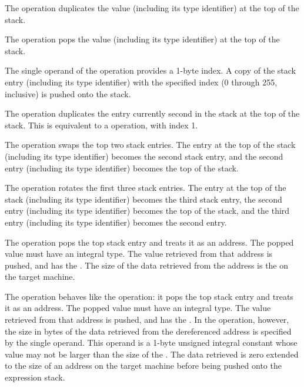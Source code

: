 \begin{enumerate}[1. ]
\itembfnl{\DWOPdupTARG}
The \DWOPdupNAME{} operation duplicates the value (including its 
type identifier) at the top of the stack.

\itembfnl{\DWOPdropTARG}
The \DWOPdropNAME{} operation pops the value (including its type 
identifier) at the top of the stack.

\itembfnl{\DWOPpickTARG}
The single operand of the \DWOPpickNAME{} operation provides a
1-byte index. A copy of the stack entry (including its 
type identifier) with the specified
index (0 through 255, inclusive) is pushed onto the stack.

\itembfnl{\DWOPoverTARG}
The \DWOPoverNAME{} operation duplicates the entry currently second
in the stack at the top of the stack. 
This is equivalent to a
\DWOPpick{} operation, with index 1.  

\itembfnl{\DWOPswapTARG}
The \DWOPswapNAME{} operation swaps the top two stack entries. 
The entry at the top of the stack (including its type identifier)
becomes the second stack entry, and the second entry (including 
its type identifier) becomes the top of the stack.

\itembfnl{\DWOProtTARG}
The \DWOProtNAME{} operation rotates the first three stack
entries. The entry at the top of the stack (including its 
type identifier) becomes the third stack entry, the second 
entry (including its type identifier) becomes the top of 
the stack, and the third entry (including its type identifier)
becomes the second entry.

\itembfnl{\DWOPderefTARG}
The \DWOPderefNAME{} operation pops the top stack entry and 
treats it as an address. The popped value must have an integral type.
The value retrieved from that address is pushed, 
and has the \generictype{}.
The size of the data retrieved from the 
address is the  on the target machine.

\itembfnl{\DWOPderefsizeTARG}
The \DWOPderefsizeNAME{} operation behaves like the 
\DWOPderef{}
operation: it pops the top stack entry and treats it as an
address. The popped value must have an integral type.
The value retrieved from that address is pushed,
and has the \generictype{}.
In the \DWOPderefsizeNAME{} operation, however, the size in bytes
of the data retrieved from the dereferenced address is
specified by the single operand. This operand is a 1-byte
unsigned integral constant whose value may not be larger
than the size of the \generictype. The data
retrieved is zero extended to the size of an address on the
target machine before being pushed onto the expression stack.


\end{enumerate}
